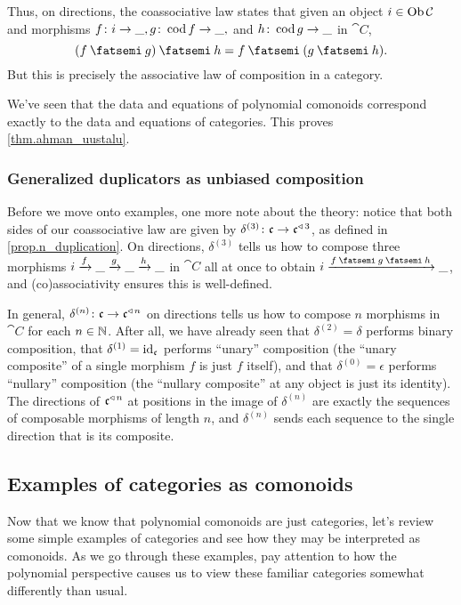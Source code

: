 \documentclass[Book-Poly]{subfiles}
\begin{document}
Thus, on directions, the coassociative law states that given an object $i\in\operatorname{Ob}\mathcal{C}$ and morphisms $f\colon i\to\_, g\colon\operatorname{cod} f\to\_,$ and $h\colon\operatorname{cod} g\to\_$ in $\cat C$,
\[
    (f\then g)\then h = f\then(g\then h).
\]
But this is precisely the associative law of composition in a category.

We've seen that the data and equations of polynomial comonoids correspond exactly to the data and equations of categories.
This proves \cref{thm.ahman_uustalu}.

\subsubsection{Generalized duplicators as unbiased composition}

Before we move onto examples, one more note about the theory: notice that both sides of our coassociative law are given by $\delta^{(3)}\colon\mathfrak{c}\to\mathfrak{c}^{\mathbin{\triangleleft}\,3}$, as defined in \cref{prop.n_duplication}.
On directions, $\delta^{(3)}$ tells us how to compose three morphisms $i\xrightarrow{f}\_\xrightarrow{g}\_\xrightarrow{h}\_$ in $\cat{C}$ all at once to obtain $i\To{f\:\then\:g\:\then\:h}\_$, and (co)associativity ensures this is well-defined.

In general, $\delta^{(n)}\colon\mathfrak{c}\to\mathfrak{c}^{\mathbin{\triangleleft}\,n}$ on directions tells us how to compose $n$ morphisms in $\cat{C}$ for each $n\in\mathbb{N}$.
After all, we have already seen that $\delta^{(2)}=\delta$ performs binary composition, that $\delta^{(1)}=\mathrm{id}_{\mathfrak{c}}$ performs ``unary'' composition (the ``unary composite'' of a single morphism $f$ is just $f$ itself), and that $\delta^{(0)}=\epsilon$ performs ``nullary'' composition (the ``nullary composite'' at any object is just its identity).
The directions of $\mathfrak{c}^{\mathbin{\triangleleft}\,n}$ at positions in the image of $\delta^{(n)}$ are exactly the sequences of composable morphisms of length $n$, and $\delta^{(n)}$ sends each sequence to the single direction that is its composite.

\subsection{Examples of categories as comonoids}
Now that we know that polynomial comonoids are just categories, let's review some simple examples of categories and see how they may be interpreted as comonoids.
As we go through these examples, pay attention to how the polynomial perspective causes us to view these familiar categories somewhat differently than usual. 
\end{document}
